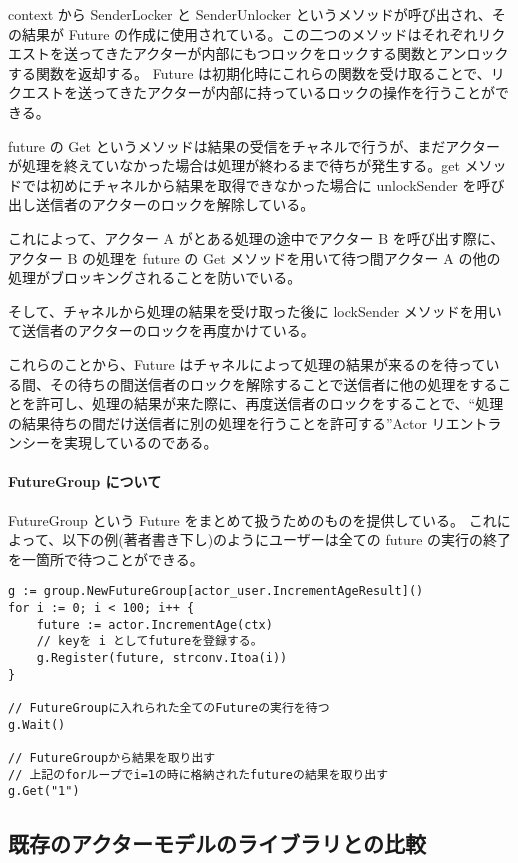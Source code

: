 context から SenderLocker と SenderUnlocker
というメソッドが呼び出され、その結果が Future
の作成に使用されている。この二つのメソッドはそれぞれリクエストを送ってきたアクターが内部にもつロックをロックする関数とアンロックする関数を返却する。
Future
は初期化時にこれらの関数を受け取ることで、リクエストを送ってきたアクターが内部に持っているロックの操作を行うことができる。

future の Get
というメソッドは結果の受信をチャネルで行うが、まだアクターが処理を終えていなかった場合は処理が終わるまで待ちが発生する。get
メソッドでは初めにチャネルから結果を取得できなかった場合に unlockSender
を呼び出し送信者のアクターのロックを解除している。

これによって、アクター A がとある処理の途中でアクター B
を呼び出す際に、アクター B の処理を future の Get
メソッドを用いて待つ間アクター A
の他の処理がブロッキングされることを防いでいる。

そして、チャネルから処理の結果を受け取った後に lockSender
メソッドを用いて送信者のアクターのロックを再度かけている。

これらのことから、Future
はチャネルによって処理の結果が来るのを待っている間、その待ちの間送信者のロックを解除することで送信者に他の処理をすることを許可し、処理の結果が来た際に、再度送信者のロックをすることで、``処理の結果待ちの間だけ送信者に別の処理を行うことを許可する''Actor
リエントランシーを実現しているのである。

\paragraph{FutureGroup
について}

FutureGroup という Future をまとめて扱うためのものを提供している。
これによって、以下の例(著者書き下し)のようにユーザーは全ての future
の実行の終了を一箇所で待つことができる。

\begin{verbatim}
g := group.NewFutureGroup[actor_user.IncrementAgeResult]()
for i := 0; i < 100; i++ {
    future := actor.IncrementAge(ctx)
    // keyを i としてfutureを登録する。
    g.Register(future, strconv.Itoa(i))
}

// FutureGroupに入れられた全てのFutureの実行を待つ
g.Wait()

// FutureGroupから結果を取り出す
// 上記のforループでi=1の時に格納されたfutureの結果を取り出す
g.Get("1")
\end{verbatim}

\subsection{既存のアクターモデルのライブラリとの比較}

